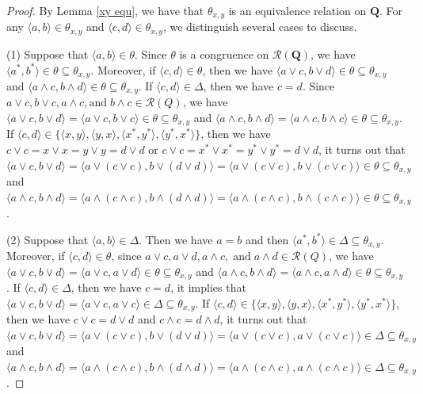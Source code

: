 \documentclass[12pt]{amsart}
\theoremstyle{definition}
\theoremstyle{remark}
\numberwithin{equation}{section}
\begin{document}
\begin{proof}
By Lemma \ref{xy equ}, we have that $\theta_{x,y}$ is an equivalence relation on $\mathbf{Q}$. For any $\langle a,b\rangle\in \theta_{x,y}$ and $\langle c,d\rangle\in \theta_{x,y}$, we distinguish several cases to discuss.

(1) Suppose that $\langle a,b\rangle\in \theta$. Since $\theta$ is a congruence on $\mathscr {R}({\mathbf{Q}})$, we have $\langle a^{\ast},b^{\ast}\rangle\in \theta\subseteq \theta_{x,y}$. Moreover, if $\langle c,d\rangle\in \theta$, then we have $\langle a\vee c,b\vee d\rangle\in \theta\subseteq \theta_{x,y}$ and $\langle a\wedge c,b\wedge d\rangle\in \theta\subseteq \theta_{x,y}$. If $\langle c,d\rangle\in \Delta$, then we have $c=d$. Since $a\vee c, b\vee c,a\wedge c,\mathrm{and}\; b\wedge c\in \mathscr{R}(Q)$, we have $\langle a\vee c,b\vee d\rangle=\langle a\vee c,b\vee c\rangle\in \theta\subseteq \theta_{x,y}$ and $\langle a\wedge c,b\wedge d\rangle=\langle a\wedge c,b\wedge c\rangle\in \theta\subseteq \theta_{x,y}$. If $\langle c,d\rangle\in \{\langle x,y\rangle, \langle y,x\rangle, \langle x^{\ast},y^{\ast}\rangle, \langle y^{\ast},x^{\ast}\rangle \}$, then we have $c\vee c=x\vee x=y\vee y=d\vee d$ or $c\vee c=x^{\ast}\vee x^{\ast}=y^{\ast}\vee y^{\ast}=d\vee d$, it turns out that $\langle a\vee c,b\vee d\rangle=\langle a\vee (c\vee c),b\vee (d\vee d)\rangle=\langle a\vee (c\vee c),b\vee (c\vee c)\rangle\in \theta\subseteq \theta_{x,y}$ and $\langle a\wedge c,b\wedge d\rangle=\langle a\wedge (c\wedge c),b\wedge (d\wedge d)\rangle=\langle a\wedge (c\wedge c),b\wedge (c\wedge c)\rangle\in \theta\subseteq \theta_{x,y}$.

(2) Suppose that $\langle a,b\rangle\in \Delta$. Then we have $a=b$ and then $\langle a^{\ast},b^{\ast}\rangle\in \Delta\subseteq \theta_{x,y}$. Moreover, if $\langle c,d\rangle\in \theta$, since $a\vee c, a\vee d,a\wedge c,\;\mathrm{and}\;a\wedge d\in \mathscr{R}(Q)$, we have $\langle a\vee c,b\vee d\rangle=\langle a\vee c,a\vee d\rangle\in \theta\subseteq \theta_{x,y}$ and $\langle a\wedge c,b\wedge d\rangle=\langle a\wedge c,a\wedge d\rangle\in \theta\subseteq \theta_{x,y}$. If $\langle c,d\rangle\in \Delta$, then we have $c=d$, it implies that $\langle a\vee c,b\vee d\rangle=\langle a\vee c,a\vee c\rangle\in \Delta\subseteq \theta_{x,y}$. If $\langle c,d\rangle\in \{\langle x,y\rangle, \langle y,x\rangle, \langle x^{\ast},y^{\ast}\rangle, \langle y^{\ast},x^{\ast}\rangle \}$, then we have $c\vee c=d\vee d$ and $c\wedge c=d\wedge d$, it turns out that $\langle a\vee c, b\vee d\rangle=\langle a\vee (c\vee c),b\vee (d\vee d)\rangle=\langle a\vee (c\vee c),a\vee (c\vee c)\rangle\in \Delta \subseteq \theta_{x,y}$ and $\langle a\wedge c, b\wedge d\rangle=\langle a\wedge (c\wedge c),b\wedge (d\wedge d)\rangle=\langle a\wedge (c\wedge c),a\wedge (c\wedge c)\rangle\in \Delta \subseteq \theta_{x,y}$.


\end{proof}
\end{document}
